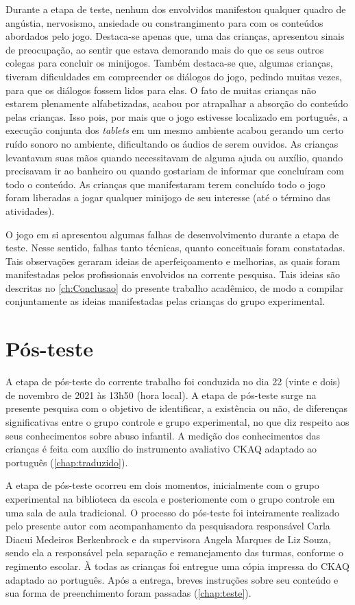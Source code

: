 Durante a etapa de teste, nenhum dos envolvidos manifestou qualquer quadro de angústia, nervosismo, ansiedade ou constrangimento para com os conteúdos abordados pelo jogo. Destaca-se apenas que, uma das crianças, apresentou sinais de preocupação, ao sentir que estava demorando mais do que os seus outros colegas para concluir os minijogos. Também destaca-se que, algumas crianças, tiveram dificuldades em compreender os diálogos do jogo, pedindo muitas vezes, para que os diálogos fossem lidos para elas. O fato de muitas crianças não estarem plenamente alfabetizadas, acabou por atrapalhar a absorção do conteúdo pelas crianças. Isso pois, por mais que o jogo estivesse localizado em português, a execução conjunta  dos \textit{tablets} em um mesmo ambiente acabou gerando um certo ruído sonoro no ambiente, dificultando os áudios de serem ouvidos. As crianças levantavam suas mãos quando necessitavam de alguma ajuda ou auxílio, quando precisavam ir ao banheiro ou quando gostariam de informar que concluíram com todo o conteúdo. As crianças que manifestaram terem concluído todo o jogo foram liberadas a jogar qualquer minijogo de seu interesse (até o término das atividades). 

O jogo em si apresentou algumas falhas de desenvolvimento durante a etapa de teste. Nesse sentido, falhas tanto técnicas, quanto conceituais foram constatadas. Tais observações geraram ideias de aperfeiçoamento e melhorias, as quais foram manifestadas pelos profissionais envolvidos na corrente pesquisa. Tais ideias são descritas no \autoref{ch:Conclusao} do presente trabalho acadêmico, de modo a compilar conjuntamente as ideias manifestadas pelas crianças do grupo experimental. 

 
\section{Pós-teste}\label{sec:postes}

A etapa de pós-teste do corrente trabalho foi conduzida no dia 22 (vinte e dois) de novembro de 2021 às 13h50 (hora local). A etapa de pós-teste surge na presente pesquisa com o objetivo de identificar, a existência ou não, de diferenças significativas entre o grupo controle e grupo experimental, no que diz respeito aos seus conhecimentos sobre abuso infantil. A medição dos conhecimentos das crianças é feita com auxílio do instrumento avaliativo \acf{CKAQ} adaptado ao português (\autoref{chap:traduzido}). 

A etapa de pós-teste ocorreu em dois momentos, inicialmente com o grupo experimental na biblioteca da escola e posteriomente com o grupo controle em uma sala de aula tradicional. O processo do pós-teste foi inteiramente realizado pelo presente autor com acompanhamento da pesquisadora responsável Carla Diacui Medeiros Berkenbrock e da supervisora Angela Marques de Liz Souza, sendo ela a responsável pela separação e remanejamento das turmas, conforme o regimento escolar. À todas as crianças foi entregue uma cópia impressa do \ac{CKAQ} adaptado ao português. Após a entrega, breves instruções sobre seu conteúdo e sua forma de preenchimento foram passadas (\autoref{chap:teste}).

